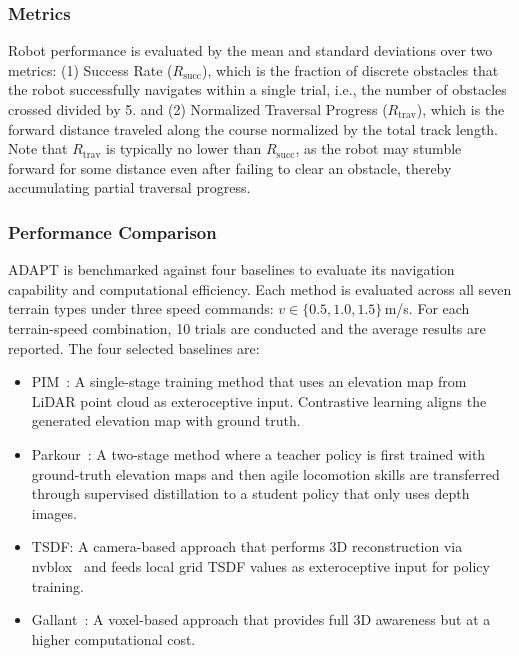 \subsubsection{Metrics}
Robot performance is evaluated by the mean and standard deviations over two metrics:
(1) Success Rate ($R_{\mathrm{succ}}$), which is the fraction of discrete obstacles that the robot successfully navigates within a single trial, i.e., the number of obstacles crossed divided by 5. 
and (2) Normalized Traversal Progress ($R_{\mathrm{trav}}$), which is the forward distance traveled along the course normalized by the total track length. Note that $R_{\mathrm{trav}}$ is typically no lower than $R_{\mathrm{succ}}$, as the robot may stumble forward for some distance even after failing to clear an obstacle, thereby accumulating partial traversal progress.

\subsubsection{Performance Comparison}
ADAPT is benchmarked against four baselines to evaluate its navigation capability and computational efficiency.
Each method is evaluated across all seven terrain types under three speed commands: $v \in \{0.5, 1.0, 1.5\}$\,m/s.
For each terrain-speed combination, 10 trials are conducted and the average results are reported.
The four selected baselines are:
\begin{itemize}
    \item PIM~\cite{long2025learning}: A single-stage training method that uses an elevation map from LiDAR point cloud as exteroceptive input. Contrastive learning aligns the generated elevation map with ground truth.
    \item Parkour~\cite{zhuang2024humanoid}: A two-stage method where a teacher policy is first trained with ground-truth elevation maps and then agile locomotion skills are transferred through supervised distillation to a student policy that only uses depth images.
    \item TSDF: A camera-based approach that performs 3D reconstruction via nvblox~\cite{nvblox_2023_GPUAcceleratedSDFMapping} and feeds local grid TSDF values as exteroceptive input for policy training.
    \item Gallant~\cite{Ben_2025_Gallant}: A voxel-based approach that provides full 3D awareness but at a higher computational cost.
\end{itemize}


